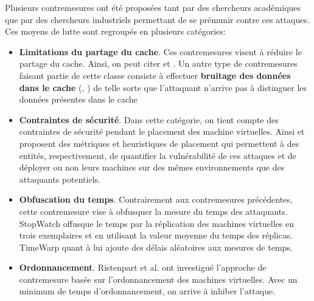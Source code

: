 \par 
Plusieurs  contremesures ont été proposées tant par des chercheurs académiques que par  des chercheurs industriels permettant de se prémunir contre ces attaques. Ces moyens de lutte  sont regroupés en plusieurs catégories:
\begin{itemize} 
 \item  \textbf{Limitations du partage du cache}.  Ces contremesures visent à réduire le partage du cache. Ainsi, on peut citer \cite{STEALTHMEM} et \cite{chameleon}. Un autre type de contremesures  faisant partie de cette classe consiste à effectuer  \textbf{bruitage des données dans  le cache} (\cite{duppel}, \cite{Godefrey}) de telle sorte que l’attaquant n’arrive pas à distinguer les données présentes dans le cache
 \item \textbf{Contraintes de sécurité}. Dans cette catégorie, on tient compte des contraintes de sécurité pendant le placement des machine virtuelles. Ainsi  \cite{Lyon1} et \cite{Lyon2}  proposent des métriques et heuristiques de placement  qui permettent à des entités, respectivement, de quantifier la vulnérabilité de ces attaques et de  déployer ou  non  leurs machines sur des mêmes environnements  que des attaquants potentiels. 
 \item  \textbf{Obfuscation du temps}. Contrairement aux contremesures précédentes, cette contremesure  vise à obfusquer la mesure du temps des attaquants.  StopWatch \cite{StopWatch}  offusque le temps par la réplication des  machines virtuelles  en trois exemplaires  et en  utilisant   la valeur moyenne du temps des réplicas. TimeWarp \cite{TimeWarp} quant à lui ajoute des délais aléatoires aux mesures de temps.  
 \item  \textbf{Ordonnancement}. Ristenpart et al. \cite{Ristenpart} ont investigué l’approche de contremesure basée sur l’ordonnancement des machines virtuelles.  Avec un minimum de temps d’ordonnancement, on arrive à inhiber l’attaque.
\end{itemize} \newline{}

